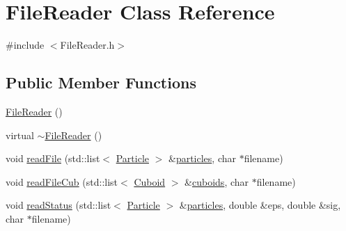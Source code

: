 \hypertarget{classFileReader}{\section{File\-Reader Class Reference}
\label{classFileReader}
}


{\ttfamily \#include $<$File\-Reader.\-h$>$}

\subsection*{Public Member Functions}
\begin{DoxyCompactItemize}
\item 
\hyperlink{classFileReader_a615dcb2443cad1f2ca123c7c0c334480}{File\-Reader} ()
\item 
virtual \hyperlink{classFileReader_a1382969e8f1468f3b04ad4b44ab39dee}{$\sim$\-File\-Reader} ()
\item 
void \hyperlink{classFileReader_a98e0f676c498629dd005101f399f2a3c}{read\-File} (std\-::list$<$ \hyperlink{classParticle}{Particle} $>$ \&\hyperlink{InputParticles_8h_acc42f43077e01f03478dad72f0e59107}{particles}, char $\ast$filename)
\item 
void \hyperlink{classFileReader_a955bc976be71f48dd87b699c59723726}{read\-File\-Cub} (std\-::list$<$ \hyperlink{classCuboid}{Cuboid} $>$ \&\hyperlink{InputCuboids_8h_a6fbb69a9e0ce5b917daeba332607a1d9}{cuboids}, char $\ast$filename)
\item 
void \hyperlink{classFileReader_a52fabe8d8298aa7d6d3b4c34e20a25bc}{read\-Status} (std\-::list$<$ \hyperlink{classParticle}{Particle} $>$ \&\hyperlink{InputParticles_8h_acc42f43077e01f03478dad72f0e59107}{particles}, double \&eps, double \&sig, char $\ast$filename)
\end{DoxyCompactItemize}


